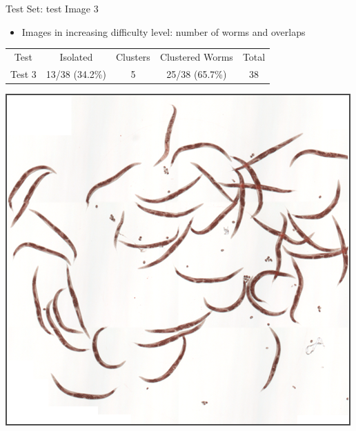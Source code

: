 \documentclass[xcolor=table]{beamer}
\begin{document}
\begin{frame}{Test Set: test Image 3}

  \begin{itemize}
  \item Images in increasing difficulty level: number of worms
    and overlaps
  \end{itemize}

\begin{table}[h]
\begin{center}
\begin{tabular}[h]{|c|c|c|c|c|}
    \hline
    \rowcolor{gray!35}
    Test & Isolated & Clusters & Clustered Worms & Total\\
    Test 3 & 13/38 (34.2\%)& 5 & 25/38 (65.7\%) & 38 \\
    \hline
  \end{tabular}
\end{center}
\end{table}

\begin{center}
\includegraphics[scale=0.25]{results/test3/original3}
\end{center}
\end{frame}

\end{document}
